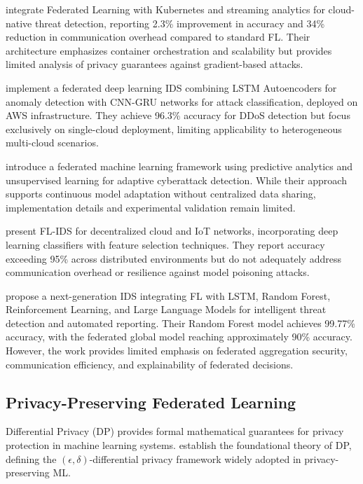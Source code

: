 \citet{nellutla2025scalable} integrate Federated Learning with Kubernetes and streaming analytics for cloud-native threat detection, reporting 2.3\% improvement in accuracy and 34\% reduction in communication overhead compared to standard FL. Their architecture emphasizes container orchestration and scalability but provides limited analysis of privacy guarantees against gradient-based attacks.

\citet{pr2026cloud} implement a federated deep learning IDS combining LSTM Autoencoders for anomaly detection with CNN-GRU networks for attack classification, deployed on AWS infrastructure. They achieve 96.3\% accuracy for DDoS detection but focus exclusively on single-cloud deployment, limiting applicability to heterogeneous multi-cloud scenarios.

\citet{laddi2024advanced} introduce a federated machine learning framework using predictive analytics and unsupervised learning for adaptive cyberattack detection. While their approach supports continuous model adaptation without centralized data sharing, implementation details and experimental validation remain limited.

\citet{selvaprasanth2025federated} present FL-IDS for decentralized cloud and IoT networks, incorporating deep learning classifiers with feature selection techniques. They report accuracy exceeding 95\% across distributed environments but do not adequately address communication overhead or resilience against model poisoning attacks.

\citet{mishra2026next} propose a next-generation IDS integrating FL with LSTM, Random Forest, Reinforcement Learning, and Large Language Models for intelligent threat detection and automated reporting. Their Random Forest model achieves 99.77\% accuracy, with the federated global model reaching approximately 90\% accuracy. However, the work provides limited emphasis on federated aggregation security, communication efficiency, and explainability of federated decisions.

\subsection{Privacy-Preserving Federated Learning}

Differential Privacy (DP) provides formal mathematical guarantees for privacy protection in machine learning systems. \citet{dwork2014algorithmic} establish the foundational theory of DP, defining the $(\epsilon, \delta)$-differential privacy framework widely adopted in privacy-preserving ML.


